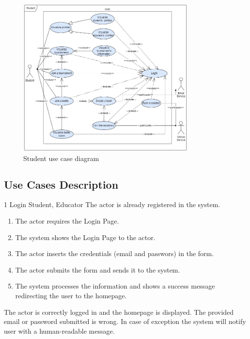 \begin{figure}[H]
    \centering
    \includegraphics[width=0.8\textwidth]{images/use_cases_diagrams/students_functions.png}
    \caption{Student use case diagram}
    \label{fig:use_case_diagram}
\end{figure}


\clearpage

\subsection{Use Cases Description}
\usecase
{1}
{Login}
{Student, Educator}
{The actor is already registered in the system.}
{
    \begin{enumerate}
        \item The actor requires the Login Page.
        \item The system shows the Login Page to the actor.
        \item The actor inserts the credentials (email and passwors) in the form.
        \item The actor submits the form and sends it to the system.
        \item The system processes the information and shows a success message redirecting the user to the homepage.
    \end{enumerate}
}
{The actor is correctly logged in and the homepage is displayed.}
{
    The provided email or password submitted is wrong.
}
{
    In case of exception the system will notify user with a human-readable message.
}
\clearpage

